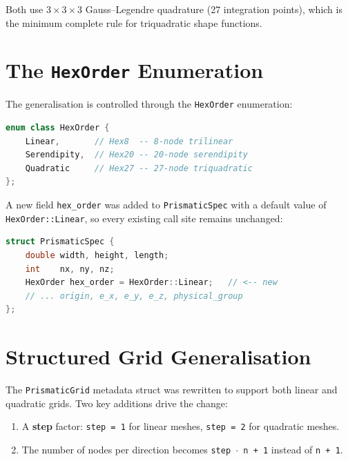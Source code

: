 Both use $3\times 3\times 3$ Gauss--Legendre quadrature (27 integration
points), which is the minimum complete rule for triquadratic shape
functions.


\section{The \texttt{HexOrder} Enumeration}
\label{sec:ho-hex-order}

The generalisation is controlled through the \texttt{HexOrder} enumeration:

\begin{lstlisting}[language=C++, basicstyle=\ttfamily\small]
enum class HexOrder {
    Linear,       // Hex8  -- 8-node trilinear
    Serendipity,  // Hex20 -- 20-node serendipity
    Quadratic     // Hex27 -- 27-node triquadratic
};
\end{lstlisting}

A new field \texttt{hex\_order} was added to \texttt{PrismaticSpec} with
a default value of \texttt{HexOrder::Linear}, so every existing call
site remains unchanged:

\begin{lstlisting}[language=C++, basicstyle=\ttfamily\small]
struct PrismaticSpec {
    double width, height, length;
    int    nx, ny, nz;
    HexOrder hex_order = HexOrder::Linear;   // <-- new
    // ... origin, e_x, e_y, e_z, physical_group
};
\end{lstlisting}


\section{Structured Grid Generalisation}
\label{sec:ho-grid}

The \texttt{PrismaticGrid} metadata struct was rewritten to support
both linear and quadratic grids.  Two key additions drive the change:

\begin{enumerate}
  \item A \textbf{step} factor: \texttt{step = 1} for linear meshes,
        \texttt{step = 2} for quadratic meshes.
  \item The number of nodes per direction becomes
        \texttt{step $\cdot$ n + 1} instead of \texttt{n + 1}.
\end{enumerate}


